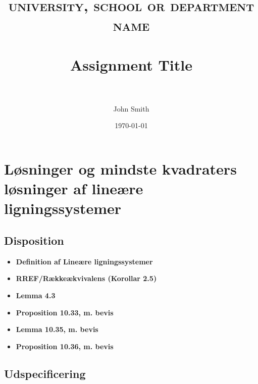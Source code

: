 \documentclass[paper=a4, fontsize=11pt]{scrartcl} %
\title{	
	\normalfont \normalsize 
	\textsc{university, school or department name} \\ [25pt] %
	\horrule{0.5pt} \\[0.4cm] %
	\huge Assignment Title \\ %
	\horrule{2pt} \\[0.5cm] %
}
\author{John Smith} %
\date{\normalsize\today} %
\begin{document}
	
	\section{Løsninger og mindste kvadraters løsninger af lineære ligningssystemer}
	
	
	\subsection{Disposition}
	
	\begin{itemize}
		\item \textbf{Definition af Lineære ligningssystemer}
		\item \textbf{RREF/Rækkeækvivalens (Korollar 2.5)}
		\item \textbf{Lemma 4.3}
		\item \textbf{Proposition 10.33, m. bevis}
		\item \textbf{Lemma 10.35, m. bevis}
		\item \textbf{Proposition 10.36, m. bevis}
	\end{itemize}
	
	\subsection{Udspecificering}
	
\end{document}

